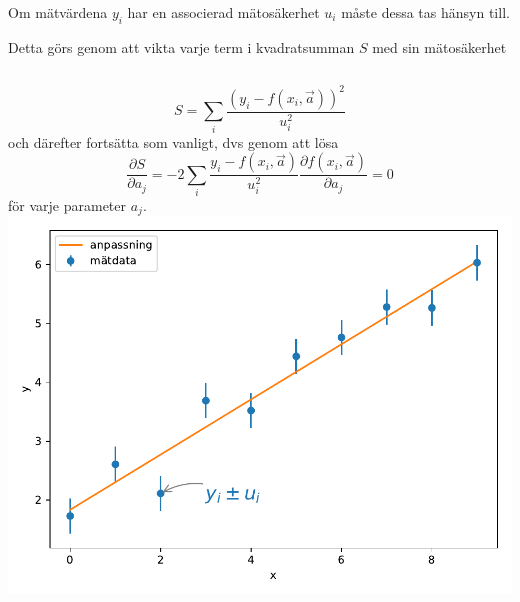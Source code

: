 \documentclass[9pt]{beamer}
\begin{document}
    \begin{frame}
        Om mätvärdena $y_i$ har en associerad mätosäkerhet $u_i$ måste dessa tas hänsyn till.

        \vfill
        Detta görs genom att vikta varje term i kvadratsumman $S$ med sin mätosäkerhet

        \vfill
        \begin{columns}
            \begin{equation*}
                S = \sum_i \frac{(y_i - f(x_i, \vec a))^2}{u_i^2}
            \end{equation*}
            och därefter fortsätta som vanligt, dvs genom att lösa
            \begin{equation*}
                \frac{\partial S}{\partial a_j} = -2\sum_i \frac{y_i - f(x_i, \vec a)}{u_i^2}\frac{\partial f(x_i, \vec a)}{\partial a_j} = 0
            \end{equation*}
            för varje parameter $a_j$.
            \includegraphics[width=\textwidth]{anpassning3.pdf}
        \end{columns}

    \end{frame}
\end{document}
